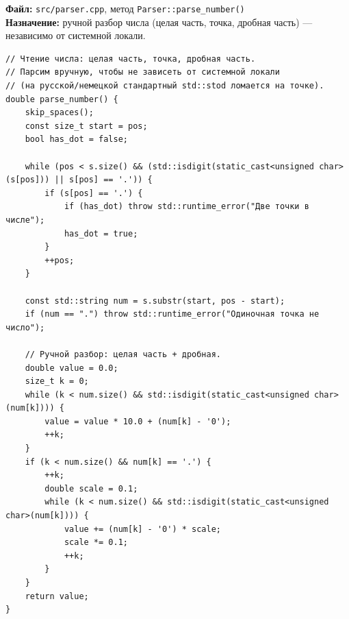 



\noindent\textbf{Файл:} \texttt{src/parser.cpp}, метод \texttt{Parser::parse\_number()}\\
\textbf{Назначение:} ручной разбор числа (целая часть, точка, дробная часть) --- независимо от системной локали.

\begin{lstlisting}
// Чтение числа: целая часть, точка, дробная часть.
// Парсим вручную, чтобы не зависеть от системной локали
// (на русской/немецкой стандартный std::stod ломается на точке).
double parse_number() {
    skip_spaces();
    const size_t start = pos;
    bool has_dot = false;

    while (pos < s.size() && (std::isdigit(static_cast<unsigned char>(s[pos])) || s[pos] == '.')) {
        if (s[pos] == '.') {
            if (has_dot) throw std::runtime_error("Две точки в числе");
            has_dot = true;
        }
        ++pos;
    }

    const std::string num = s.substr(start, pos - start);
    if (num == ".") throw std::runtime_error("Одиночная точка не число");

    // Ручной разбор: целая часть + дробная.
    double value = 0.0;
    size_t k = 0;
    while (k < num.size() && std::isdigit(static_cast<unsigned char>(num[k]))) {
        value = value * 10.0 + (num[k] - '0');
        ++k;
    }
    if (k < num.size() && num[k] == '.') {
        ++k;
        double scale = 0.1;
        while (k < num.size() && std::isdigit(static_cast<unsigned char>(num[k]))) {
            value += (num[k] - '0') * scale;
            scale *= 0.1;
            ++k;
        }
    }
    return value;
}
\end{lstlisting}


